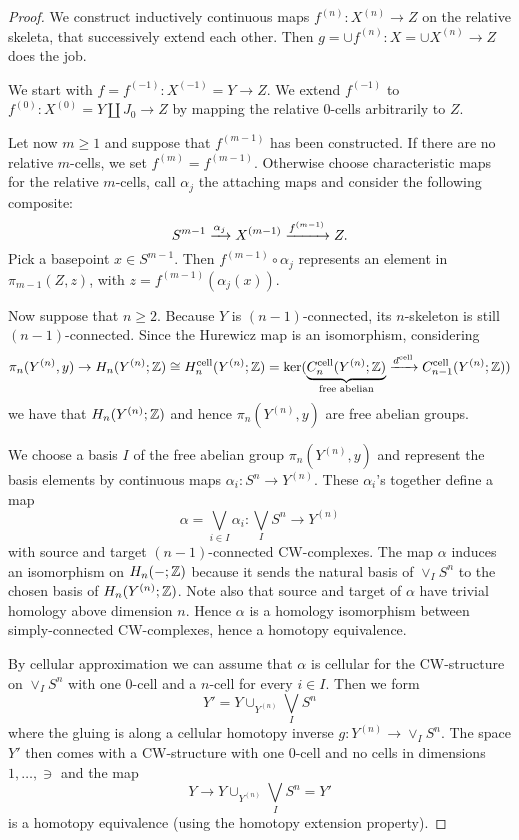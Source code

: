 \begin{proof}
We construct inductively continuous maps $f^{(n)}:X^{(n)}\to Z$ on the relative skeleta, that successively extend each other. Then $g=\cup f^{(n)}:X=\cup X^{(n)}\to Z$ does the job.

We start with $f=f^{(-1)}:X^{(-1)}=Y\to Z$. We extend $f^{(-1)}$ to $f^{(0)}:X^{(0)}=Y\amalg J_0\to Z$ by mapping the relative $0$-cells arbitrarily to $Z$.

Let now $m\ge1$ and suppose that $f^{(m-1)}$ has been constructed. If there are no relative $m$-cells, we set $f^{(m)}=f^{(m-1)}$. Otherwise choose characteristic maps for the relative $m$-cells, call $\alpha_j$ the attaching maps and consider the following composite:
\[S^{m-1}\xrightarrow{\alpha_j}X^{(m-1)}\xrightarrow{ f^{(m-1)}}Z.\]
Pick a basepoint $x\in S^{m-1}$. Then $f^{(m-1)}\circ\alpha_j$ represents an element in $\pi_{m-1}(Z,z)$, with $z=f^{(m-1)}(\alpha_j(x))$.

Now suppose that $n\ge2$. Because $Y$ is $(n-1)$-connected, its $n$-skeleton is still $(n-1)$-connected. Since the Hurewicz map is an isomorphism, considering
\[\pi_n(Y^{(n)},y)\to H_n(Y^{(n)};{\mathbb Z})\cong H^\text{cell}_n(Y^{(n)};{\mathbb Z})=\ker(\underbrace{C^\text{cell}_n(Y^{(n)};{\mathbb Z})}_{\text{free abelian}}\xrightarrow{d^\text{cell}}C^\text{cell}_{n-1}(Y^{(n)};{\mathbb Z}))\]
we have that $H_n(Y^{(n)};{\mathbb Z})$ and hence $\pi_n(Y^{(n)},y)$ are free abelian groups.

We choose a basis $I$ of the free abelian group $\pi_n(Y^{(n)},y)$ and represent the basis elements by continuous maps $\alpha_i:S^n\to Y^{(n)}$. These $\alpha_i$'s together define a map
\[\alpha=\bigvee_{i\in I}\alpha_i:\bigvee_I S^n\to Y^{(n)}\]
with source and target $(n-1)$-connected CW-complexes. The map $\alpha$ induces an isomorphism on $H_n(-;{\mathbb Z})$ because it sends the natural basis of $\vee_I S^n$ to the chosen basis of $H_n(Y^{(n)};{\mathbb Z})$. Note also that source and target of $\alpha$ have trivial homology above dimension $n$. Hence $\alpha$ is a homology isomorphism between simply-connected CW-complexes, hence a homotopy equivalence.

By cellular approximation we can assume that $\alpha$ is cellular for the CW-structure on $\vee_I S^n$ with one $0$-cell and a $n$-cell for every $i\in I$. Then we form
\[Y'=Y\cup_{Y^{(n)}}\bigvee_I S^n\]
where the gluing is along a cellular homotopy inverse $g:Y^{(n)}\to \vee_I S^n$. The space $Y'$ then comes with a CW-structure with one $0$-cell and no cells in dimensions $1,\dots,\ni$ and the map
\[Y\to Y\cup_{Y^{(n)}}\bigvee_I S^n=Y'\]
is a homotopy equivalence (using the homotopy extension property).
\end{proof}
